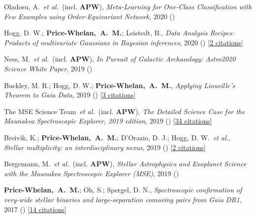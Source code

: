 \item[{\color{deemph}\scriptsize8}]Oladosu, A.~\textit{et al.}~(incl. \textbf{APW}), \textit{Meta-Learning for One-Class Classification with Few Examples using Order-Equivariant Network}, 2020 ()

\item[{\color{deemph}\scriptsize7}]Hogg, D. W.; \textbf{Price-Whelan,~A.~M.}; Leistedt, B., \textit{Data Analysis Recipes: Products of multivariate Gaussians in Bayesian inferences}, 2020 () [\href{http://adsabs.harvard.edu/abs/2020arXiv200514199H}{2 citations}]

\item[{\color{deemph}\scriptsize6}]Ness, M.~\textit{et al.}~(incl. \textbf{APW}), \textit{In Pursuit of Galactic Archaeology: Astro2020 Science White Paper}, 2019 ()

\item[{\color{deemph}\scriptsize5}]Buckley, M. R.; Hogg, D. W.; \textbf{Price-Whelan,~A.~M.}, \textit{Applying Liouville's Theorem to Gaia Data}, 2019 () [\href{http://adsabs.harvard.edu/abs/2019arXiv190700987B}{3 citations}]

\item[{\color{deemph}\scriptsize4}]The MSE Science Team~\textit{et al.}~(incl. \textbf{APW}), \textit{The Detailed Science Case for the Maunakea Spectroscopic Explorer, 2019 edition}, 2019 () [\href{http://adsabs.harvard.edu/abs/2019arXiv190404907T}{34 citations}]

\item[{\color{deemph}\scriptsize3}]Breivik, K.; \textbf{Price-Whelan,~A.~M.}; D'Orazio, D. J.; Hogg, D. W.~\textit{et al.}, \textit{Stellar multiplicity: an interdisciplinary nexus}, 2019 () [\href{http://adsabs.harvard.edu/abs/2019arXiv190305094B}{2 citations}]

\item[{\color{deemph}\scriptsize2}]Bergemann, M.~\textit{et al.}~(incl. \textbf{APW}), \textit{Stellar Astrophysics and Exoplanet Science with the Maunakea Spectroscopic Explorer (MSE)}, 2019 ()

\item[{\color{deemph}\scriptsize1}]\textbf{Price-Whelan,~A.~M.}; Oh, S.; Spergel, D. N., \textit{Spectroscopic confirmation of very-wide stellar binaries and large-separation comoving pairs from Gaia DR1}, 2017 () [\href{http://adsabs.harvard.edu/abs/2017arXiv170903532P}{14 citations}]